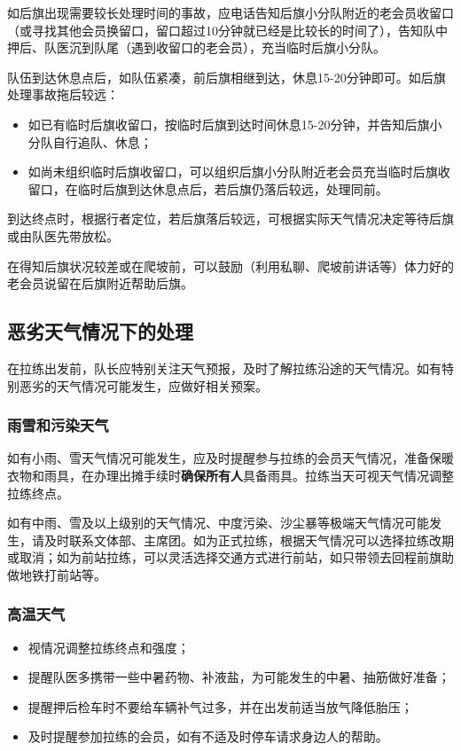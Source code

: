 \documentclass[UTF8]{ctexart}
\begin{document}
如后旗出现需要较长处理时间的事故，应电话告知后旗小分队附近的老会员收留口（或寻找其他会员换留口，留口超过10分钟就已经是比较长的时间了），告知队中押后、队医沉到队尾（遇到收留口的老会员），充当临时后旗小分队。

队伍到达休息点后，如队伍紧凑，前后旗相继到达，休息15-20分钟即可。如后旗处理事故拖后较远：
\begin{itemize}[nosep,left=2em]
    \item 如已有临时后旗收留口，按临时后旗到达时间休息15-20分钟，并告知后旗小分队自行追队、休息；
    \item 如尚未组织临时后旗收留口，可以组织后旗小分队附近老会员充当临时后旗收留口，在临时后旗到达休息点后，若后旗仍落后较远，处理同前。
\end{itemize}

到达终点时，根据行者定位，若后旗落后较远，可根据实际天气情况决定等待后旗或由队医先带放松。

在得知后旗状况较差或在爬坡前，可以鼓励（利用私聊、爬坡前讲话等）体力好的老会员说留在后旗附近帮助后旗。

\subsection{恶劣天气情况下的处理}

在拉练出发前，队长应特别关注天气预报，及时了解拉练沿途的天气情况。如有特别恶劣的天气情况可能发生，应做好相关预案。

\subsubsection{雨雪和污染天气}

如有小雨、雪天气情况可能发生，应及时提醒参与拉练的会员天气情况，准备保暖衣物和雨具，在办理出摊手续时\textbf{确保所有人}具备雨具。拉练当天可视天气情况调整拉练终点。

如有中雨、雪及以上级别的天气情况、中度污染、沙尘暴等极端天气情况可能发生，请及时联系文体部、主席团。如为正式拉练，根据天气情况可以选择拉练改期或取消；如为前站拉练，可以灵活选择交通方式进行前站，如只带领去回程前旗助做地铁打前站等。

\subsubsection{高温天气}

\begin{itemize}[nosep,left=2em]
    \item 视情况调整拉练终点和强度；
    \item 提醒队医多携带一些中暑药物、补液盐，为可能发生的中暑、抽筋做好准备；
    \item 提醒押后检车时不要给车辆补气过多，并在出发前适当放气降低胎压；
    \item 及时提醒参加拉练的会员，如有不适及时停车请求身边人的帮助。
\end{itemize}
\end{document}
